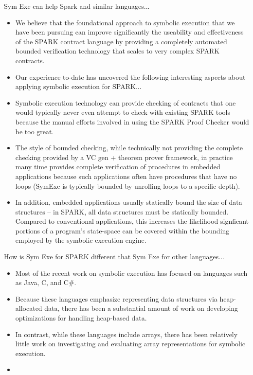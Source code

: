 Sym Exe can help Spark and similar languages...
\begin{itemize}
\item We believe that the foundational approach to symbolic execution 
that we have been pursuing can improve significantly the useability
and effectiveness of the SPARK contract language by providing a
completely automated bounded verification technology that scales to 
very complex SPARK contracts.
\item Our experience to-date has uncovered the following interesting
  aspects about applying symbolic execution for SPARK...
\item Symbolic execution
  technology can provide checking of contracts that one would
  typically never even attempt to check with existing SPARK tools because the manual
efforts involved in using the SPARK Proof Checker would be too great.
\item The style of bounded checking, while technically not providing
  the complete checking provided by a VC gen + theorem prover
  framework, in practice many time provides complete verification of
  procedures in embedded applications because such applications often 
  have procedures that have no loops (SymExe is typically bounded by
  unrolling loops to a specific depth).
\item In addition, embedded applications usually statically bound the
  size of data structures -- in SPARK, all data structures must be
  statically bounded.  Compared to conventional applications, this
  increases the likelihood signficant portions of a program's
  state-space can be covered within the bounding employed by the
  symbolic execution engine.
\end{itemize}

How is Sym Exe for SPARK different that Sym Exe for other languages...
\begin{itemize}
\item Most of the recent work on symbolic execution has focused on
  languages such as Java, C, and C\#.  
\item Because these languages emphasize representing data structures 
via heap-allocated data, there has been a substantial amount of work
on developing optimizations for handling heap-based data.
\item In contrast, while these languages include arrays, there has
  been relatively little work on investigating and evaluating array representations
  for symbolic execution.
\item 
\end{itemize}


